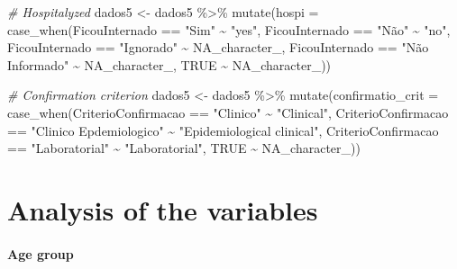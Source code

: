 \documentclass[
]{article}
\newenvironment{Shaded}{\begin{snugshade}}{\end{snugshade}}
\newcommand{\AttributeTok}[1]{\textcolor[rgb]{0.77,0.63,0.00}{#1}}
\newcommand{\CommentTok}[1]{\textcolor[rgb]{0.56,0.35,0.01}{\textit{#1}}}
\newcommand{\ConstantTok}[1]{\textcolor[rgb]{0.00,0.00,0.00}{#1}}
\newcommand{\FunctionTok}[1]{\textcolor[rgb]{0.00,0.00,0.00}{#1}}
\newcommand{\NormalTok}[1]{#1}
\newcommand{\OtherTok}[1]{\textcolor[rgb]{0.56,0.35,0.01}{#1}}
\newcommand{\SpecialCharTok}[1]{\textcolor[rgb]{0.00,0.00,0.00}{#1}}
\newcommand{\StringTok}[1]{\textcolor[rgb]{0.31,0.60,0.02}{#1}}
\begin{document}
\begin{Shaded}
\begin{Highlighting}[]
\CommentTok{\# Hospitalyzed}
\NormalTok{dados5 }\OtherTok{\textless{}{-}}\NormalTok{  dados5 }\SpecialCharTok{\%\textgreater{}\%}
  \FunctionTok{mutate}\NormalTok{(}\AttributeTok{hospi =} \FunctionTok{case\_when}\NormalTok{(FicouInternado }\SpecialCharTok{==} \StringTok{"Sim"} \SpecialCharTok{\textasciitilde{}} \StringTok{"yes"}\NormalTok{,}
\NormalTok{                              FicouInternado }\SpecialCharTok{==} \StringTok{"Não"} \SpecialCharTok{\textasciitilde{}} \StringTok{"no"}\NormalTok{,}
\NormalTok{                              FicouInternado }\SpecialCharTok{==} \StringTok{"Ignorado"} \SpecialCharTok{\textasciitilde{}} \ConstantTok{NA\_character\_}\NormalTok{,}
\NormalTok{                              FicouInternado }\SpecialCharTok{==} \StringTok{"Não Informado"} \SpecialCharTok{\textasciitilde{}} \ConstantTok{NA\_character\_}\NormalTok{,}
                              \ConstantTok{TRUE} \SpecialCharTok{\textasciitilde{}} \ConstantTok{NA\_character\_}\NormalTok{))}

\CommentTok{\# Confirmation criterion}
\NormalTok{dados5 }\OtherTok{\textless{}{-}}\NormalTok{  dados5 }\SpecialCharTok{\%\textgreater{}\%}
  \FunctionTok{mutate}\NormalTok{(}\AttributeTok{confirmatio\_crit =} \FunctionTok{case\_when}\NormalTok{(CriterioConfirmacao }\SpecialCharTok{==} \StringTok{"Clinico"} \SpecialCharTok{\textasciitilde{}} \StringTok{"Clinical"}\NormalTok{,}
\NormalTok{                              CriterioConfirmacao }\SpecialCharTok{==} \StringTok{"Clinico Epdemiologico"} \SpecialCharTok{\textasciitilde{}} \StringTok{"Epidemiological clinical"}\NormalTok{,}
\NormalTok{                              CriterioConfirmacao }\SpecialCharTok{==} \StringTok{"Laboratorial"} \SpecialCharTok{\textasciitilde{}}             \StringTok{"Laboratorial"}\NormalTok{,}
                              \ConstantTok{TRUE} \SpecialCharTok{\textasciitilde{}} \ConstantTok{NA\_character\_}\NormalTok{))}
\end{Highlighting}
\end{Shaded}

\hypertarget{analysis-of-the-variables}{%
\section{Analysis of the variables}\label{analysis-of-the-variables}}

\hypertarget{age-group}{%
\paragraph{\texorpdfstring{{ Age group
}}{ Age group }}\label{age-group}}
\end{document}
